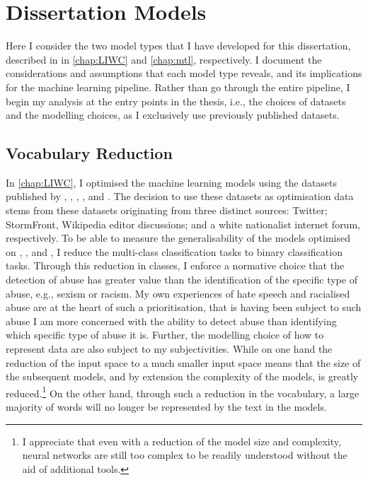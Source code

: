 {\section{Dissertation Models}
Here I consider the two model types that I have developed for this dissertation, described in in \autoref{chap:LIWC} and \autoref{chap:mtl}, respectively.
I document the considerations and assumptions that each model type reveals, and its implications for the machine learning pipeline.
Rather than go through the entire pipeline, I begin my analysis at the entry points in the thesis, i.e., the choices of datasets and the modelling choices, as I exclusively use previously published datasets.

\subsection{Vocabulary Reduction}\label{sub:vocab_redux}
In \autoref{chap:LIWC}, I optimised the machine learning models using the datasets published by \citet{Davidson:2017}, \citet{Waseem:2016}, \citet{Waseem-Hovy:2016}, \citet{Wulczyn:2016}, and \citet{Garcia:2018}.
The decision to use these datasets as optimisation data stems from these datasets originating from three distinct sources: Twitter; StormFront, Wikipedia editor discussions; and a white nationalist internet forum, respectively.
To be able to measure the generalisability of the models optimised on \citet{Davidson:2017}, \citet{Waseem:2016}, and \citet{Waseem-Hovy:2016}, I reduce the multi-class classification tasks to binary classification tasks.
Through this reduction in classes, I enforce a normative choice that the detection of abuse has greater value than the identification of the specific type of abuse, e.g., sexism or racism.
My own experiences of hate speech and racialised abuse are at the heart of such a prioritisation, that is having been subject to such abuse I am more concerned with the ability to detect abuse than identifying which specific type of abuse it is.
Further, the modelling choice of how to represent data are also subject to my subjectivities.
While on one hand the reduction of the input space to a much smaller input space means that the size of the subsequent models, and by extension the complexity of the models, is greatly reduced.\footnote{I appreciate that even with a reduction of the model size and complexity, neural networks are still too complex to be readily understood without the aid of additional tools.}
On the other hand, through such a reduction in the vocabulary, a large majority of words will no longer be represented by the text in the models.
}
